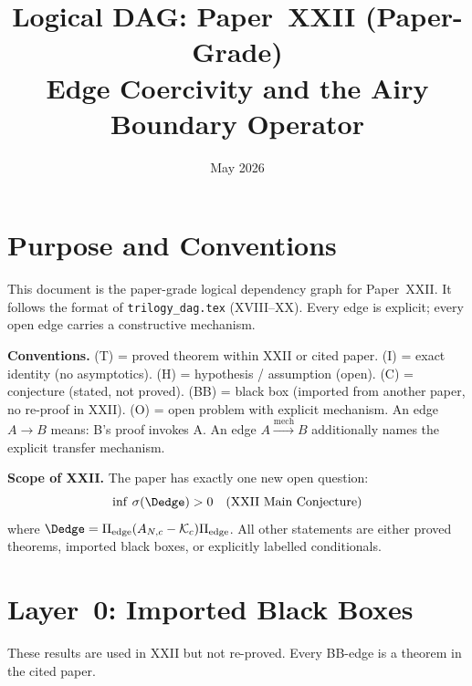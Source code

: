 \documentclass[12pt,a4paper]{amsart}
\theoremstyle{definition}
\begin{document}
\title{Logical DAG: Paper~XXII (Paper-Grade)\\
Edge Coercivity and the Airy Boundary Operator}
\date{May 2026}
\maketitle

\tableofcontents

\section{Purpose and Conventions}
\label{sec:purpose}

This document is the paper-grade logical dependency graph for Paper~XXII.
It follows the format of \texttt{trilogy\_dag.tex} (XVIII--XX).
Every edge is explicit; every open edge carries a constructive mechanism.

\medskip
\textbf{Conventions.}
(T) = proved theorem within XXII or cited paper.
(I) = exact identity (no asymptotics).
(H) = hypothesis / assumption (open).
(C) = conjecture (stated, not proved).
(BB) = black box (imported from another paper, no re-proof in XXII).
(O) = open problem with explicit mechanism.
An edge $A\to B$ means: B's proof invokes A.
An edge $A\xrightarrow{\mathrm{mech}}B$ additionally names
the explicit transfer mechanism.

\medskip
\textbf{Scope of XXII.}
The paper has exactly one new open question:
\[
  \inf\,\sigma(\Dedge) > 0
  \quad (\text{XXII Main Conjecture})
\]
where $\Dedge = \Pi_{\mathrm{edge}}(A_{N,c}-\mathcal{K}_c)\Pi_{\mathrm{edge}}$.
All other statements are either proved theorems, imported black boxes,
or explicitly labelled conditionals.

\section{Layer~0: Imported Black Boxes}
\label{sec:L0}

These results are used in XXII but not re-proved.
Every BB-edge is a theorem in the cited paper.
\end{document}
